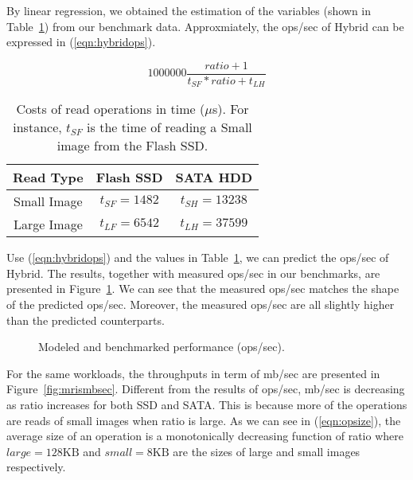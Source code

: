 By linear regression, we obtained the estimation of the variables
(shown in Table~\ref{tbl:variable}) from our benchmark data.
Approxmiately, the ops/sec of Hybrid can be expressed in
(\ref{eqn:hybridops}).

\begin{equation}
\label{eqn:hybridops}
    1000000 \frac{ratio + 1}{t_{SF} * ratio + t_{LH}}
\end{equation}

\begin{table}[tc]
{\centering \footnotesize
\begin{tabular}{c|c|c}
\hline 
  Read Type & Flash SSD & SATA HDD \\ \hline
  Small Image & $t_{SF} = 1482$ & $t_{SH} = 13238$ \\ 
  Large Image & $t_{LF} = 6542$ & $t_{LH} = 37599$ \\ \hline
\end{tabular}
 \caption{Costs of read operations in time ($\mu$s). For instance,
$t_{SF}$ is the time of reading a Small image from the Flash SSD.}
\label{tbl:variable}
}
\end{table}

Use (\ref{eqn:hybridops}) and the values in Table~\ref{tbl:variable},
we can predict the ops/sec of Hybrid. The results, together with
measured ops/sec in our benchmarks, are presented in
Figure~\ref{fig:opspred}. We can see that the measured ops/sec
matches the shape of the predicted ops/sec. Moreover, the measured
ops/sec are all slightly higher than the predicted counterparts.


\begin{figure}[t]
\begin{centering}
\caption{Modeled and benchmarked performance (ops/sec).}
\label{fig:opspred}
\end{centering}
\end{figure}

For the same workloads, the throughputs in term of mb/sec are
presented in Figure~\ref{fig:mrismbsec}. Different from the results of
ops/sec, mb/sec is decreasing as ratio increases for both SSD and
SATA. This is because more of the operations are reads of small images
when ratio is large. As we can see in (\ref{eqn:opsize}), the average
size of an operation is a monotonically decreasing function of ratio
where $large = 128\mbox{KB}$ and $small = 8\mbox{KB}$ are the sizes of
large and small images respectively.

